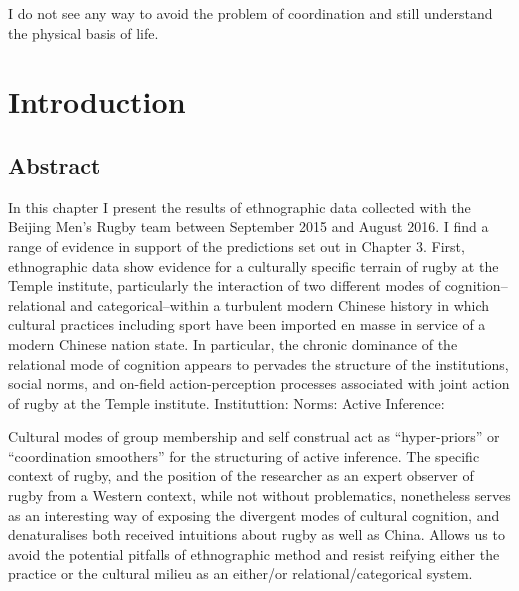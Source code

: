 

\begin{savequote}[8cm]

  I do not see any way to avoid the problem of coordination and still understand the physical basis of life.

\end{savequote}






\chapter{\label{introduction}Introduction}

\minitoc
\section{Abstract}
In this chapter I present the results of ethnographic data collected with the Beijing Men's Rugby team between September 2015 and August 2016.  I find a range of evidence in support of the predictions set out in Chapter 3.  First, ethnographic data show evidence  for a culturally specific terrain of rugby at the Temple institute, particularly the interaction of two different modes of cognition--relational and categorical--within a turbulent modern Chinese history in which cultural practices including sport have been imported en masse in service of a modern Chinese nation state. In particular, the chronic dominance of the relational mode of cognition appears to pervades the structure of the institutions, social norms, and on-field action-perception processes associated with joint action of rugby at the Temple institute.  Instituttion:  Norms: Active Inference:

Cultural modes of group membership and self construal act as ``hyper-priors'' or ``coordination smoothers'' for the structuring of active inference.  The specific context of rugby, and the position of the researcher as an expert observer of rugby from a Western context, while not without problematics, nonetheless serves as an interesting way of exposing the divergent modes of cultural cognition, and denaturalises both received intuitions about rugby as well as China.  Allows us to avoid the potential pitfalls of ethnographic method and resist reifying either the practice or the cultural milieu as an either/or relational/categorical system.

